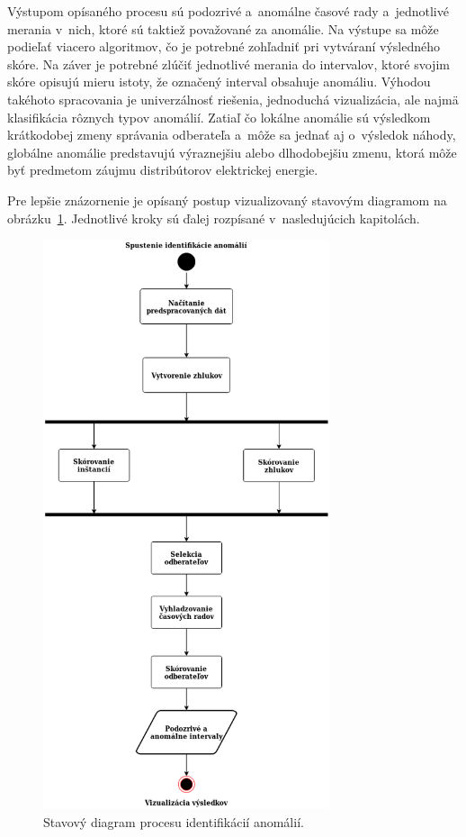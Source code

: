 \documentclass[a4paper,twoside,slovak,12pt,appendix]{article}
\begin{document}
Výstupom opísaného procesu sú podozrivé a~anomálne časové rady a~jednotlivé
merania v~nich, ktoré sú taktiež považované za anomálie. Na výstupe sa môže
podieľať viacero algoritmov, čo je potrebné zohľadniť pri vytváraní výsledného
skóre. Na záver je potrebné zlúčiť jednotlivé merania do intervalov, ktoré
svojim skóre opisujú mieru istoty, že označený interval obsahuje anomáliu.
Výhodou takéhoto spracovania je univerzálnosť riešenia, jednoduchá vizualizácia,
ale najmä klasifikácia rôznych typov anomálií. Zatiaľ čo lokálne anomálie sú
výsledkom krátkodobej zmeny správania odberateľa a~môže sa jednať aj o~výsledok
náhody, globálne anomálie predstavujú výraznejšiu alebo dlhodobejšiu zmenu,
ktorá môže byť predmetom záujmu distribútorov elektrickej energie.

Pre lepšie znázornenie je opísaný postup vizualizovaný stavovým diagramom na
obrázku~\ref{fig:state-diagram}. Jednotlivé kroky sú ďalej rozpísané
v~nasledujúcich kapitolách.

\begin{figure}[htbp]
  \centering
  \includegraphics[width=0.75\textwidth]{state_diagram.png}
  \caption{Stavový diagram procesu identifikácií anomálií.}
  \label{fig:state-diagram}
\end{figure}
\end{document}
